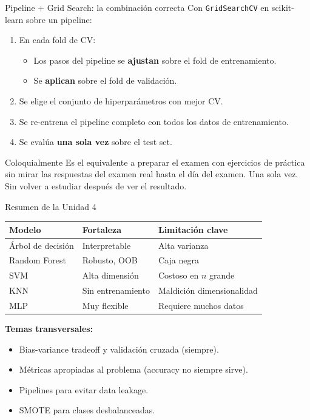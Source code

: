 \documentclass[aspectratio=169]{beamer}
\begin{document}
\begin{frame}{Pipeline + Grid Search: la combinación correcta}
  Con \texttt{GridSearchCV} en scikit-learn sobre un pipeline:

  \medskip
  \begin{enumerate}
    \item En cada fold de CV:
    \begin{itemize}
      \item Los pasos del pipeline se \textbf{ajustan} sobre el fold de entrenamiento.
      \item Se \textbf{aplican} sobre el fold de validación.
    \end{itemize}
    \item Se elige el conjunto de hiperparámetros con mejor CV.
    \item Se re-entrena el pipeline completo con todos los datos de entrenamiento.
    \item Se evalúa \textbf{una sola vez} sobre el test set.
  \end{enumerate}

  \medskip
  \begin{exampleblock}{Coloquialmente}
    Es el equivalente a preparar el examen con ejercicios de práctica
    sin mirar las respuestas del examen real hasta el día del examen.
    Una sola vez. Sin volver a estudiar después de ver el resultado.
  \end{exampleblock}
\end{frame}

\begin{frame}{Resumen de la Unidad 4}
  \begin{center}
  \begin{tabular}{lll}
    \toprule
    \textbf{Modelo} & \textbf{Fortaleza} & \textbf{Limitación clave} \\
    \midrule
    Árbol de decisión & Interpretable      & Alta varianza \\
    Random Forest     & Robusto, OOB       & Caja negra \\
    SVM               & Alta dimensión     & Costoso en $n$ grande \\
    KNN               & Sin entrenamiento  & Maldición dimensionalidad \\
    MLP               & Muy flexible       & Requiere muchos datos \\
    \bottomrule
  \end{tabular}
  \end{center}

  \bigskip
  \textbf{Temas transversales:}
  \begin{itemize}
    \item Bias-variance tradeoff y validación cruzada (siempre).
    \item Métricas apropiadas al problema (accuracy no siempre sirve).
    \item Pipelines para evitar data leakage.
    \item SMOTE para clases desbalanceadas.
  \end{itemize}
\end{frame}
\end{document}
